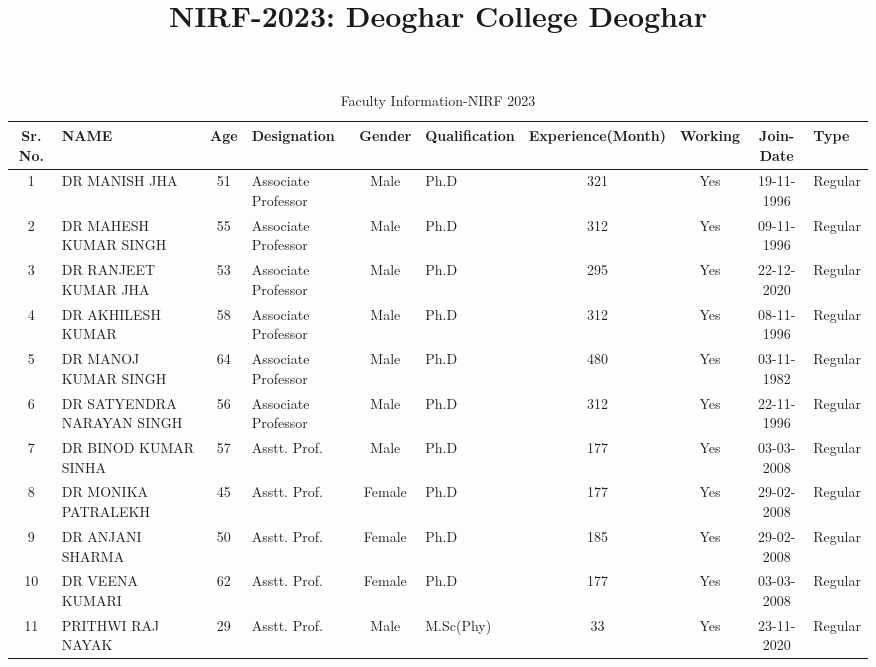 \documentclass[a4paper]{article} %
\title{NIRF-2023: Deoghar College Deoghar}
\date{}
\begin{document}
\maketitle

\begin{landscape} %
\begin{table}[htbp]
\centering
\caption{Faculty Information-NIRF 2023}
\label{tab:faculty}
\begin{tabular}{|c|l|c|l|c|l|c|c|c|l|}
\hline
\textbf{Sr. No.} & \MakeUppercase{\textbf{Name}} & \textbf{Age} & \textbf{Designation} & \textbf{Gender} & \textbf{Qualification} & \textbf{Experience(Month)} & \textbf{Working} & \textbf{Join-Date} & \textbf{Type} \\
\hline
1 & \MakeUppercase{Dr Manish Jha} & 51 & \cellcolor{lightgray}Associate Professor & Male & Ph.D & 321 & Yes & 19-11-1996 & Regular \\
2 & \MakeUppercase{Dr Mahesh Kumar Singh} & 55 & \cellcolor{lightgray}Associate Professor & Male & Ph.D & 312 & Yes & 09-11-1996 & Regular \\
3 & \MakeUppercase{DR RANJEET KUMAR JHA} & 53 & \cellcolor{lightgray}Associate Professor & Male & Ph.D & 295 & Yes & 22-12-2020 & Regular \\
4 & \MakeUppercase{DR AKHILESH KUMAR} & 58 & \cellcolor{lightgray}Associate Professor & Male & Ph.D & 312 & Yes & 08-11-1996 & Regular \\
5 & \MakeUppercase{DR MANOJ KUMAR SINGH} & 64 & \cellcolor{lightgray}Associate Professor & Male & Ph.D & 480 & Yes & 03-11-1982 & Regular \\
6 & \MakeUppercase{DR SATYENDRA NARAYAN SINGH} & 56 & \cellcolor{lightgray}Associate Professor & Male & Ph.D & 312 & Yes & 22-11-1996 & Regular \\
\hline
\hline
7 & \MakeUppercase{Dr Binod Kumar Sinha} & 57 & Asstt. Prof. & Male & Ph.D & 177 & Yes & 03-03-2008 & Regular \\
8 & \MakeUppercase{Dr Monika Patralekh} & 45 & Asstt. Prof. & Female & Ph.D & 177 & Yes & 29-02-2008 & Regular \\
9 & \MakeUppercase{Dr Anjani Sharma} & 50 & Asstt. Prof. & Female & Ph.D & 185 & Yes & 29-02-2008 & Regular \\
10 & \MakeUppercase{DR VEENA KUMARI} & 62 & Asstt. Prof. & Female & Ph.D & 177 & Yes & 03-03-2008 & Regular \\
11 & \MakeUppercase{PRITHWI RAJ NAYAK} & 29 & Asstt. Prof. & Male & M.Sc(Phy) & 33 & Yes & 23-11-2020 & Regular \\

\end{tabular}
\end{table}
\end{landscape}
\end{document}
